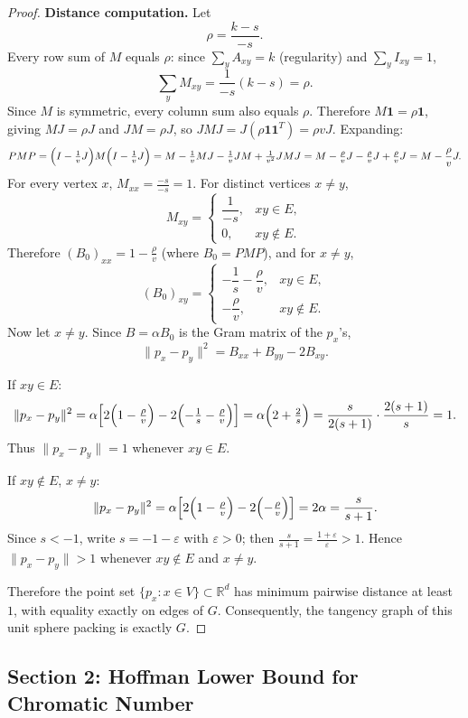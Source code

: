\documentclass{article}
\theoremstyle{definition}
\begin{document}
\begin{proof}
\textbf{Distance computation.} Let
\[
\rho=\frac{k-s}{-s}.
\]
Every row sum of $M$ equals $\rho$: since $\sum_y A_{xy}=k$ (regularity) and $\sum_y I_{xy}=1$,
\[
\sum_y M_{xy}=\frac{1}{-s}(k-s)=\rho.
\]
Since $M$ is symmetric, every column sum also equals $\rho$. Therefore $M\mathbf{1}=\rho\mathbf{1}$, giving $MJ=\rho J$ and $JM=\rho J$, so $JMJ=J(\rho\mathbf{1}\mathbf{1}^T)=\rho v J$. Expanding:
\[
PMP=\Bigl(I-\tfrac{1}{v}J\Bigr)M\Bigl(I-\tfrac{1}{v}J\Bigr)
=M-\tfrac{1}{v}MJ-\tfrac{1}{v}JM+\tfrac{1}{v^2}JMJ
=M-\tfrac{\rho}{v}J-\tfrac{\rho}{v}J+\tfrac{\rho}{v}J
=M-\frac{\rho}{v}J.
\]
For every vertex $x$, $M_{xx}=\frac{-s}{-s}=1$. For distinct vertices $x\neq y$,
\[
M_{xy}=
\begin{cases}
\dfrac{1}{-s}, & xy\in E,\\[4pt]
0, & xy\notin E.
\end{cases}
\]
Therefore $(B_0)_{xx}=1-\frac{\rho}{v}$ (where $B_0=PMP$), and for $x\neq y$,
\[
(B_0)_{xy}=
\begin{cases}
-\dfrac{1}{s}-\dfrac{\rho}{v}, & xy\in E,\\[6pt]
-\dfrac{\rho}{v}, & xy\notin E.
\end{cases}
\]
Now let $x\neq y$. Since $B=\alpha B_0$ is the Gram matrix of the $p_x$'s,
\[
\|p_x-p_y\|^2 = B_{xx}+B_{yy}-2B_{xy}.
\]

If $xy\in E$:
\[
\|p_x-p_y\|^2
=\alpha\Bigl[2\Bigl(1-\tfrac{\rho}{v}\Bigr)-2\Bigl(-\tfrac{1}{s}-\tfrac{\rho}{v}\Bigr)\Bigr]
=\alpha\Bigl(2+\tfrac{2}{s}\Bigr)
=\frac{s}{2(s+1)}\cdot\frac{2(s+1)}{s}=1.
\]
Thus $\|p_x-p_y\|=1$ whenever $xy\in E$.

If $xy\notin E$, $x\neq y$:
\[
\|p_x-p_y\|^2
=\alpha\Bigl[2\Bigl(1-\tfrac{\rho}{v}\Bigr)-2\Bigl(-\tfrac{\rho}{v}\Bigr)\Bigr]
=2\alpha=\frac{s}{s+1}.
\]
Since $s<-1$, write $s=-1-\varepsilon$ with $\varepsilon>0$; then $\frac{s}{s+1}=\frac{1+\varepsilon}{\varepsilon}>1$. Hence $\|p_x-p_y\|>1$ whenever $xy\notin E$ and $x\neq y$.

Therefore the point set $\{p_x:x\in V\}\subset\mathbb R^d$ has minimum pairwise distance at least $1$, with equality exactly on edges of $G$. Consequently, the tangency graph of this unit sphere packing is exactly $G$.
\end{proof}

\subsection*{Section 2: Hoffman Lower Bound for Chromatic Number}
\end{document}

